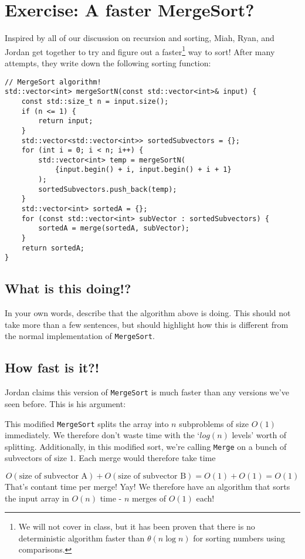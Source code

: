 \documentclass [12pt]{article}
\begin{document}
\section{Exercise: A faster MergeSort? }
Inspired by all of our discussion on recursion and sorting, Miah, Ryan, and Jordan get together to try and figure out a faster\footnote{We will not cover in class, but it has been proven that there is no deterministic algorithm faster than $\theta(n \log n)$ for sorting numbers using comparisons.} way to sort! After many attempts, they write down the following sorting function:

\vspace{2em}
\begin{verbatim}
// MergeSort algorithm!
std::vector<int> mergeSortN(const std::vector<int>& input) {
    const std::size_t n = input.size();
    if (n <= 1) {
        return input;
    }
    std::vector<std::vector<int>> sortedSubvectors = {};
    for (int i = 0; i < n; i++) {
        std::vector<int> temp = mergeSortN(
            {input.begin() + i, input.begin() + i + 1}
        );
        sortedSubvectors.push_back(temp);
    }
    std::vector<int> sortedA = {};
    for (const std::vector<int> subVector : sortedSubvectors) {
        sortedA = merge(sortedA, subVector);
    }
    return sortedA;
}
\end{verbatim}

\subsection{What is this doing!?  }
In your own words, describe that the algorithm above is doing. This should not take more than a few sentences, but should highlight how this is different from the normal implementation of \texttt{MergeSort}.


\subsection{How fast is it?! }
Jordan claims this version of \texttt{MergeSort} is much faster than any versions we've seen before. This is his argument:

\begin{displayquote}
    This modified \texttt{MergeSort} splits the array into $n$ subproblems of size $O(1)$ immediately. We therefore don’t waste time with the `$log(n)$ levels’ worth of splitting. Additionally, in this modified sort, we’re calling \texttt{Merge} on a bunch of subvectors of size $1$. Each merge would therefore take time

    $$
        O(\text{size of subvector A}) + O(\text{size of subvector B}) = O(1) + O(1) = O(1)
    $$
    That's contant time per merge! Yay! We therefore have an algorithm that sorts the input array in $O(n)$ time - $n$ merges of $O(1)$ each!
\end{displayquote}
\end{document}

